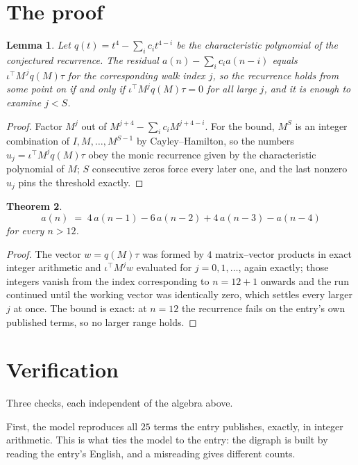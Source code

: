 \documentclass[11pt,a4paper]{article}
\theoremstyle{plain}
\newtheorem{theorem}{Theorem}
\newtheorem{lemma}[theorem]{Lemma}
\theoremstyle{definition}
\begin{document}
\section{The proof}

\begin{lemma}\label{lem:crit}
Let $q(t)=t^{4}-\sum_i c_it^{4-i}$ be the characteristic polynomial of the
conjectured recurrence. The residual $a(n)-\sum_ic_ia(n-i)$ equals
$\iota^{\!\top}M^{\,j}q(M)\tau$ for the corresponding walk index $j$, so the recurrence
holds from some point on if and only if $\iota^{\!\top}M^{j}q(M)\tau=0$ for all large $j$,
and it is enough to examine $j<S$.
\end{lemma}

\begin{proof}
Factor $M^{j}$ out of $M^{j+4}-\sum_ic_iM^{j+4-i}$. For the bound, $M^{S}$
is an integer combination of $I,M,\dots,M^{S-1}$ by Cayley--Hamilton, so the numbers
$u_j=\iota^{\!\top}M^{j}q(M)\tau$ obey the monic recurrence given by the characteristic
polynomial of $M$; $S$ consecutive zeros force every later one, and the last nonzero $u_j$
pins the threshold exactly.
\end{proof}

\begin{theorem}
\[
a(n)\;=\;4\,a(n-1) - 6\,a(n-2) + 4\,a(n-3) - a(n-4)
\]
for every $n>12$.
\end{theorem}

\begin{proof}
The vector $w=q(M)\tau$ was formed by $4$ matrix--vector products in exact integer
arithmetic and $\iota^{\!\top}M^{j}w$ evaluated for $j=0,1,\dots$, again exactly; those
integers vanish from the index corresponding to $n=12+1$ onwards and the run continued
until the working vector was identically zero, which settles every larger $j$ at once. The bound is exact: at $n=12$ the recurrence fails on the entry's own published terms, so no larger range holds.
\end{proof}

\section{Verification}

Three checks, each independent of the algebra above.

First, the model reproduces all $25$ terms the entry publishes, exactly, in integer
arithmetic. This is what ties the model to the entry: the digraph is built by reading the
entry's English, and a misreading gives different counts.
\end{document}
